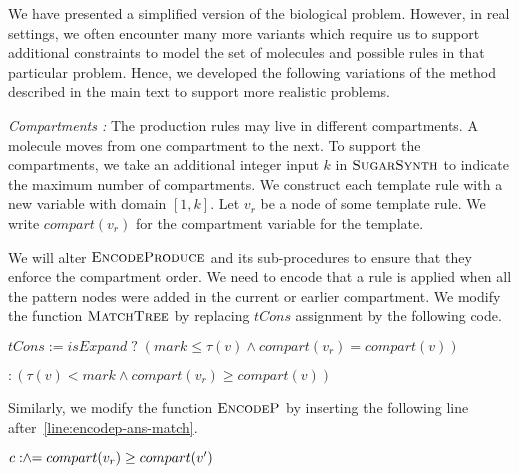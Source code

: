 We have presented a simplified version of
the biological problem. However, in real settings, we often encounter many more variants which require us to support additional constraints to model the set of molecules and possible rules in that particular problem. Hence, we developed the following variations of the method described in the main text to support more realistic problems.


{\em Compartments : } The production rules may live in different compartments.
A molecule moves from one compartment to the next.
To support the compartments, we take an additional integer
input $k$ in $\textsc{SugarSynth}$ to indicate the maximum number
of compartments.
We construct each template rule with a new variable with domain $[1,k]$.
Let $v_r$ be a node of some template rule. We write $compart(v_r)$
for the compartment variable for the template.

We will alter $\textsc{EncodeProduce}$ and its sub-procedures to
ensure that they enforce the compartment order.
We need to encode that a rule is applied when all the
pattern nodes were added in the current or earlier compartment.
We modify the function $\textsc{MatchTree}$ by replacing
$tCons$ assignment by the following code.\\
\begin{minipage}{1.0\linewidth}
\begin{algorithmic}[1]
  \State $tCons := isExpand \;?\; ( mark \leq \tau(v)  \land compart(v_r) = compart(v) )$\par
  \mbox{}\qquad\qquad\hspace{10mm} $:( \tau(v) < mark  \land compart(v_r) \geq compart(v) )$
\end{algorithmic}
\end{minipage}
Similarly, we modify the function
$\textsc{EncodeP}$ by inserting the following line after~\ref{line:encodep-ans-match}.\\
\begin{minipage}{1.0\linewidth}
\begin{algorithmic}[1]
  \State $c \mathrel{:\hspace{-3pt}\land\hspace{-3pt}=} compart(v_r) \geq compart(v')$
\end{algorithmic}  
\end{minipage}

